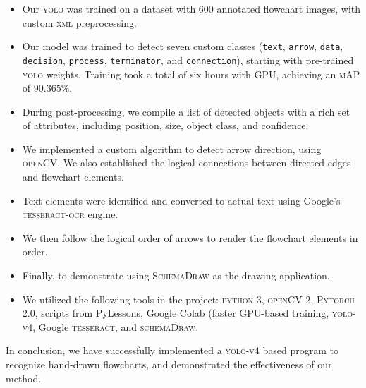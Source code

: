 \documentclass[10pt]{article}
\begin{document}
\begin{itemize}
\item Our \textsc{yolo} was trained on a dataset with 600 annotated flowchart
images, with custom \textsc{xml} preprocessing.
\item Our model was trained to detect seven custom classes (\texttt{text}, \texttt{arrow}, \texttt{data}, \texttt{decision}, \texttt{process}, \texttt{terminator}, and \texttt{connection}), starting with
pre-trained \textsc{yolo} weights. Training took a total of six hours with
\textsc{GPU}, achieving an \textsc{mAP} of $90.365\%$.
\item During post-processing, we compile a list of detected objects with a
rich set of attributes, including position, size, object class, and confidence.
\item We implemented a custom algorithm to detect arrow direction, using
\textsc{openCV}. We also established the logical connections between directed
edges and flowchart elements.
\item Text elements were identified and converted to actual text using
Google's \textsc{tesseract-ocr} engine.
\item We then follow the logical order of arrows to render the flowchart
elements in order.
\item Finally, to demonstrate  using \textsc{SchemaDraw} as the drawing application.
\item We utilized the following tools in the project: \textsc{python 3},
\textsc{openCV 2}, \textsc{Pytorch 2.0}, scripts from PyLessons,
Google Colab (faster \textsc{GPU}-based training,
\textsc{yolo-v4}, Google \textsc{tesseract}, and
\textsc{schemaDraw}.
\end{itemize}


In conclusion,
we have successfully implemented a \textsc{yolo-v4} based program to
recognize hand-drawn flowcharts, and demonstrated the effectiveness of our
method.

\end{document}
